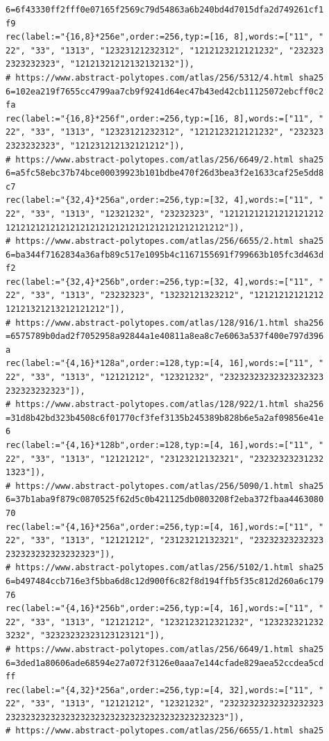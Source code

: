 \documentclass[
  11pt,
  a4paper,
]{article}
\begin{document}
\begin{verbatim}
6=6f43330ff2fff0e07165f2569c79d54863a6b240bd4d7015dfa2d749261cf1
f9
rec(label:="{16,8}*256e",order:=256,typ:=[16, 8],words:=["11", "
22", "33", "1313", "12323121232312", "1212123212121232", "232323
2323232323", "12121321212132132132"]),
# https://www.abstract-polytopes.com/atlas/256/5312/4.html sha25
6=102ea219f7655cc4799aa7cb9f9241d64ec47b43ed42cb11125072ebcff0c2
fa
rec(label:="{16,8}*256f",order:=256,typ:=[16, 8],words:=["11", "
22", "33", "1313", "12323121232312", "1212123212121232", "232323
2323232323", "121231212132121212"]),
# https://www.abstract-polytopes.com/atlas/256/6649/2.html sha25
6=a5fc58ebc37b74bce00039923b101bdbe470f26d3bea3f2e1633caf25e5dd8
c7
rec(label:="{32,4}*256a",order:=256,typ:=[32, 4],words:=["11", "
22", "33", "1313", "12321232", "23232323", "12121212121212121212
12121212121212121212121212121212121212121212"]),
# https://www.abstract-polytopes.com/atlas/256/6655/2.html sha25
6=ba344f7162834a36afb89c517e1095b4c1167155691f799663b105fc3d463d
f2
rec(label:="{32,4}*256b",order:=256,typ:=[32, 4],words:=["11", "
22", "33", "1313", "23232323", "13232121323212", "12121212121212
12121321213212121212"]),
# https://www.abstract-polytopes.com/atlas/128/916/1.html sha256
=6575789b0dad2f7052958a92844a1e40811a8ea8c7e6063a537f400e797d396
a
rec(label:="{4,16}*128a",order:=128,typ:=[4, 16],words:=["11", "
22", "33", "1313", "12121212", "12321232", "23232323232323232323
232323232323"]),
# https://www.abstract-polytopes.com/atlas/128/922/1.html sha256
=31d8b42bd323b4508c6f01770cf3fef3135b245389b828b6e5a2af09856e41e
6
rec(label:="{4,16}*128b",order:=128,typ:=[4, 16],words:=["11", "
22", "33", "1313", "12121212", "23123212132321", "23232323231232
1323"]),
# https://www.abstract-polytopes.com/atlas/256/5090/1.html sha25
6=37b1aba9f879c0870525f62d5c0b421125db0803208f2eba372fbaa4463080
70
rec(label:="{4,16}*256a",order:=256,typ:=[4, 16],words:=["11", "
22", "33", "1313", "12121212", "23123212132321", "23232323232323
232323232323232323"]),
# https://www.abstract-polytopes.com/atlas/256/5102/1.html sha25
6=b497484ccb716e3f5bba6d8c12d900f6c82f8d194ffb5f35c812d260a6c179
76
rec(label:="{4,16}*256b",order:=256,typ:=[4, 16],words:=["11", "
22", "33", "1313", "12121212", "1232123212321232", "123232321232
3232", "32323232323123123121"]),
# https://www.abstract-polytopes.com/atlas/256/6649/1.html sha25
6=3ded1a80606ade68594e27a072f3126e0aaa7e144cfade829aea52ccdea5cd
ff
rec(label:="{4,32}*256a",order:=256,typ:=[4, 32],words:=["11", "
22", "33", "1313", "12121212", "12321232", "23232323232323232323
23232323232323232323232323232323232323232323"]),
# https://www.abstract-polytopes.com/atlas/256/6655/1.html sha25

\end{verbatim}
\end{document}

